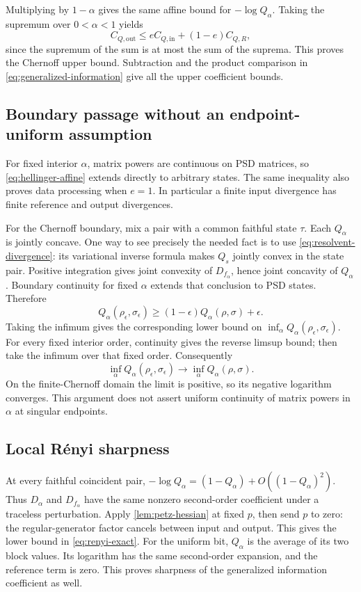 \documentclass[11pt]{article}
\numberwithin{equation}{section}
\theoremstyle{definition}
\theoremstyle{remark}
\begin{document}
Multiplying by $1-\alpha$ gives the same affine bound for
$-\log Q_\alpha$. Taking the supremum over $0<\alpha<1$ yields
\[
 C_{Q,\mathrm{out}}
 \leq eC_{Q,\mathrm{in}}+(1-e)C_{Q,R},
\]
since the supremum of the sum is at most the sum of the suprema.
This proves the Chernoff upper bound. Subtraction and the product
comparison in \eqref{eq:generalized-information} give all the upper
coefficient bounds.

\subsection{Boundary passage without an endpoint-uniform assumption}

For fixed interior $\alpha$, matrix powers are continuous on PSD matrices,
so \eqref{eq:hellinger-affine} extends directly to arbitrary states.
The same inequality also proves data processing when $e=1$.
In particular a finite input divergence has finite reference and output
divergences.

For the Chernoff boundary, mix a pair with a common faithful state $\tau$.
Each $Q_\alpha$ is jointly concave. One way to see precisely the needed
fact is to use \eqref{eq:resolvent-divergence}: its variational inverse
formula makes $Q_s$ jointly convex in the state pair. Positive
integration gives joint convexity of $D_{f_\alpha}$, hence joint
concavity of $Q_\alpha$. Boundary continuity for fixed $\alpha$ extends
that conclusion to PSD states. Therefore
\[
 Q_\alpha(\rho_\epsilon,\sigma_\epsilon)
 \geq(1-\epsilon)Q_\alpha(\rho,\sigma)+\epsilon.
\]
Taking the infimum gives the corresponding lower bound on
$\inf_\alpha Q_\alpha(\rho_\epsilon,\sigma_\epsilon)$.
For every fixed interior order, continuity gives the reverse
limsup bound; then take the infimum over that fixed order.
Consequently
\begin{equation}
 \inf_\alpha Q_\alpha(\rho_\epsilon,\sigma_\epsilon)
 \longrightarrow \inf_\alpha Q_\alpha(\rho,\sigma).
 \label{eq:chernoff-boundary}
\end{equation}
On the finite-Chernoff domain the limit is positive, so its negative
logarithm converges. This argument does not assert uniform continuity
of matrix powers in $\alpha$ at singular endpoints.

\subsection{Local R\'enyi sharpness}

At every faithful coincident pair,
$-\log Q_\alpha=(1-Q_\alpha)+O((1-Q_\alpha)^2)$.
Thus $D_\alpha$ and $D_{f_\alpha}$ have the same nonzero
second-order coefficient under a traceless perturbation.
Apply \cref{lem:petz-hessian} at fixed $p$, then send $p$ to zero:
the regular-generator factor cancels between input and output.
This gives the lower bound in \eqref{eq:renyi-exact}.
For the uniform bit, $Q_\alpha$ is the average of its two block
values. Its logarithm has the same second-order expansion, and the
reference term is zero. This proves sharpness of the generalized
information coefficient as well.
\end{document}
